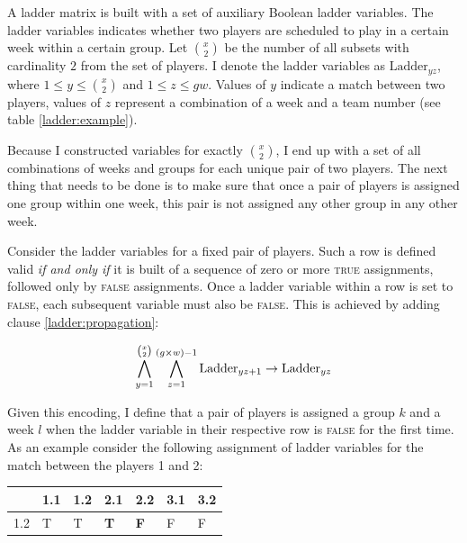 \documentclass[a4paper]{scrartcl}
\begin{document}
A ladder matrix is built with a set of auxiliary Boolean ladder variables. The ladder variables indicates whether two players are scheduled to play in a certain week within a certain group. Let ${x \choose 2}$ be the number of all subsets with cardinality $2$ from the set of players. I denote the ladder variables as $\text{Ladder}_{yz}$, where $1 \leq y \leq {x \choose 2}$ and $1 \leq z \leq gw$. Values of $y$ indicate a match between two players, values of $z$ represent a combination of a week and a team number (see table \ref{ladder:example}). 



Because I constructed variables for exactly ${x \choose 2}$, I end up with a set of all combinations of weeks and groups for each unique pair of two players. The next thing that needs to be done is to make sure that once a pair of players is assigned one group within one week, this pair is not assigned any other group in any other week.

Consider the ladder variables for a fixed pair of players. Such a row is defined valid \emph{if and only if} it is built of a sequence of zero or more \textsc{true} assignments, followed only by \textsc{false} assignments. Once a ladder variable within a row is set to \textsc{false}, each subsequent variable must also be \textsc{false}. This is achieved by adding clause \eqref{ladder:propagation}:

\begin{equation}
\label{ladder:propagation}
\centering
    \bigwedge \limits_{y=1}^{{x \choose 2}}
    \bigwedge \limits_{z=1}^{(g \times w)-1}
    \text{Ladder}_{yz+1}
    \to
    \text{Ladder}_{yz}
\end{equation}

Given this encoding, I define that a pair of players is assigned a group $k$ and a week $l$ when the ladder variable in their respective row is \textsc{false} for the first time. As an example consider the following assignment of ladder variables for the match between the players 1 and 2:

\begin{table}[h]
\centering
\begin{tabular}{ l | l | l | l | l | l | l }
    & 1.1 & 1.2 & 2.1 & 2.2 & 3.1 & 3.2 \\
\hline
1.2 & T & T & \textbf{T} & \textbf{F} & F & F \\
\end{tabular}
\end{table}
\end{document}
